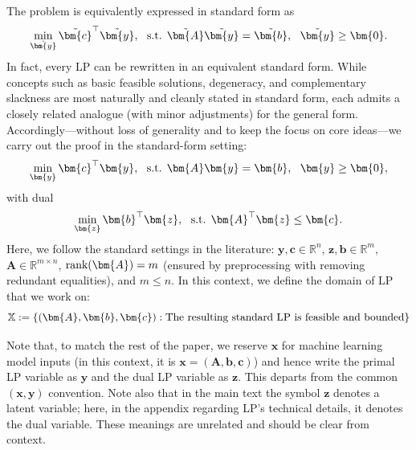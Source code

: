 \documentclass{amsart} %
\def\vzero{{\bm{0}}}
\def\vb{{\bm{b}}}
\def\vc{{\bm{c}}}
\def\vx{{\bm{x}}}
\def\vy{{\bm{y}}}
\def\vz{{\bm{z}}}
\def\mA{{\bm{A}}}
\def\sR{{\mathbb{R}}}
\def\sX{{\mathbb{X}}}
\theoremstyle{definition}
\theoremstyle{remark}
\begin{document}
The problem is equivalently expressed in standard form as
\[ \min_{\tilde{\vy}} \tilde{\vc}^\top \tilde{\vy}, ~~ \textup{s.t. } \tilde{\mA}\tilde{\vy}=\tilde{\vb},~~ \tilde{\vy} \geq \vzero. \]
In fact, every LP can be rewritten in an equivalent standard form. While concepts such as basic feasible solutions, degeneracy, and complementary slackness are most naturally and cleanly stated in standard form, each admits a closely related analogue (with minor adjustments) for the general form. Accordingly—without loss of generality and to keep the focus on core ideas—we carry out the proof in the standard-form setting:
\[
\min_{{\vy}} {\vc}^\top {\vy}, ~~ \textup{s.t. } {\mA}{\vy}={\vb},~~ {\vy} \geq \vzero,
\]
with dual
\[
\min_{{\vz}} {\vb}^\top {\vz}, ~~ \textup{s.t. } {\mA^\top}{\vz}\leq{\vc}. 
\]
Here, we follow the standard settings in the literature: $\vy,\vc \in \sR^n$, $\vz,\vb \in \sR^m$, $\mA \in \sR^{m \times n}$, $\textup{rank}(\mA)=m$ (ensured by preprocessing with removing redundant equalities), and $m \leq n$. In this context, we define the domain of LP that we work on:
\[ \sX:= \{(\mA,\vb,\vc): \textup{The resulting standard LP is feasible and bounded}\} \]

Note that, to match the rest of the paper, we reserve $\vx$ for machine learning model inputs (in this context, it is $\vx=(\mA,\vb,\vc)$) and hence write the primal LP variable as $\vy$ and the dual LP variable as $\vz$. This departs from the common $(\vx,\vy)$ convention. Note also that in the main text the symbol $\vz$ denotes a latent variable; here, in the appendix regarding LP's technical details, it denotes the dual variable. These meanings are unrelated and should be clear from context.
\end{document}
